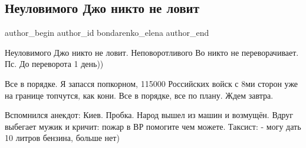  
 
 
 
 
 
\subsection{Неуловимого Джо никто не ловит}
\label{sec:29_11_2021.fb.bondarenko_elena.1.dzho_perevorot}
 
\ifcmt
 author_begin
   author_id bondarenko_elena
 author_end
\fi

Неуловимого Джо никто не ловит.
Неповоротливого Во никто не переворачивает.
Пс. До переворота 1 день))

\begin{cmtfront}

Все в порядке. Я запасся попкорном, 115000 Российских войск с 8ми сторон уже на
границе топчутся, как кони. Все в порядке, все по плану. Ждем завтра.


Вспомнился анекдот: Киев. Пробка. Народ вышел из машин и возмущён. Вдруг
выбегает мужик и кричит: пожар в ВР помогите чем можете. Таксист: - могу дать
10 литров бензина, больше нет)

\end{cmtfront}

